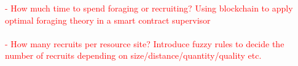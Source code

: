 \documentclass[runningheads]{llncs}
\newcommand{\red}[1]{\textcolor{red}{#1}}
\newcommand{\blue}[1]{\textcolor{blue}{#1}}
\begin{document}
\red{
- How much time to spend foraging or recruiting? Using blockchain to apply optimal foraging theory in a smart contract supervisor \\ \\
- How many recruits per resource site? Introduce fuzzy rules to decide the number of recruits depending on size/distance/quantity/quality etc.\\ \\
}

\blue{\lipsum[1-2]}



\end{document}
